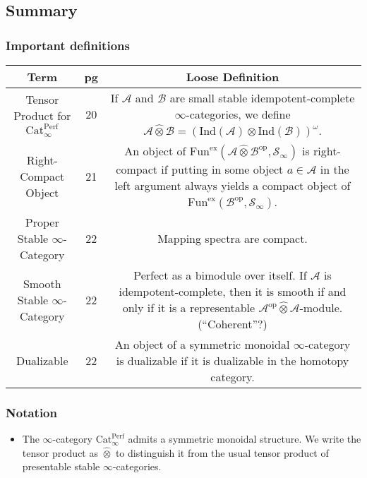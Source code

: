 \documentclass[letterpaper]{article}
\theoremstyle{definition}
\begin{document}
\subsection{Summary}

\subsubsection{Important definitions}
\begin{tabulary}{0.7\textwidth}{|C|C|C|}
\hline
Term & pg & Loose Definition\\
\hline
\hline
Tensor Product for $\mathrm{Cat}^\mathrm{Perf}_\infty$ & 20 & If $\mathcal{A}$ and $\mathcal{B}$ are small stable idempotent-complete $\infty$-categories, we define $\mathcal{A} \widehat{\otimes} \mathcal{B} = (\mathrm{Ind}(\mathcal{A}) \otimes \mathrm{Ind}(\mathcal{B}))^\omega$. \\ \hline
Right-Compact Object & 21 & An object of $\mathrm{Fun}^\mathrm{ex}(\mathcal{A} \widehat{\otimes} \mathcal{B}^\mathrm{op} , \mathcal{S}_\infty)$ is right-compact if putting in some object $a \in \mathcal{A}$ in the left argument always yields a compact object of $\mathrm{Fun}^\mathrm{ex}(\mathcal{B}^\mathrm{op} , \mathcal{S}_\infty)$. \\ \hline
Proper Stable $\infty$-Category & 22 & Mapping spectra are compact. \\ \hline
Smooth Stable $\infty$-Category & 22 & Perfect as a bimodule over itself. If $\mathcal{A}$ is idempotent-complete, then it is smooth if and only if it is a representable $\mathcal{A}^{\mathrm{op}} \widehat{\otimes} \mathcal{A}$-module. (``Coherent''?) \\ \hline
Dualizable & 22 & An object of a symmetric monoidal $\infty$-category is dualizable if it is dualizable in the homotopy category. \\ \hline
\end{tabulary}


\subsubsection{Notation}

\begin{itemize}
    \item The $\infty$-category $\mathrm{Cat}_\infty^\mathrm{Perf}$ admits a symmetric monoidal structure. We write the tensor product as $\widehat{\otimes}$ to distinguish it from the usual tensor product of presentable stable $\infty$-categories.
\end{itemize}
\end{document}
